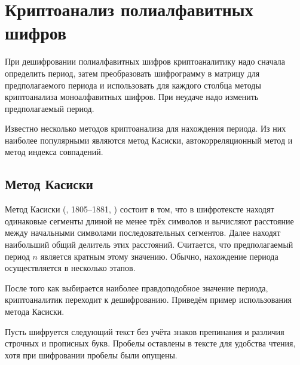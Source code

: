 \section[Криптоанализ полиалфавитных шифров]{Криптоанализ полиалфавитных \protect\\ шифров}

При дешифровании полиалфавитных шифров криптоаналитику надо сначала определить период, затем преобразовать шифрограмму в матрицу для предполагаемого периода и использовать для каждого столбца методы криптоанализа моноалфавитных шифров. При неудаче надо изменить предполагаемый период.

Известно несколько методов криптоанализа для нахождения периода. Из них наиболее популярными являются метод Касиски, автокорреляционный метод и метод индекса совпадений.


\subsection{Метод Касиски}

Метод Касиски (, 1805--1881, \cite{Kasiski:1863}) состоит в том, что в шифротексте находят одинаковые сегменты длиной не менее трёх символов и вычисляют расстояние между начальными символами последовательных сегментов. Далее находят наибольший общий делитель этих расстояний. Считается, что предполагаемый период $n$ является кратным этому значению. Обычно, нахождение периода осуществляется в несколько этапов.

После того как выбирается наиболее правдоподобное значение периода, криптоаналитик переходит к дешифрованию. Приведём пример использования метода Касиски.

\example
Пусть шифруется следующий текст без учёта знаков препинания и различия строчных и прописных букв. Пробелы оставлены в тексте для удобства чтения, хотя при шифровании пробелы были опущены.

